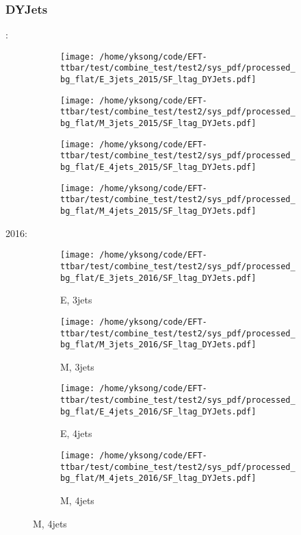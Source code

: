 \documentclass{beamer}
\begin{document}
\begin{frame}
\frametitle{DYJets}
\fontsize{5}{1}:
\begin{figure}
\centering
\begin{subfigure}[b]{0.24\textwidth}
\texttt{[image: /home/yksong/code/EFT-ttbar/test/combine\_test/test2/sys\_pdf/processed\_bg\_flat/E\_3jets\_2015/SF\_ltag\_DYJets.pdf]}
\end{subfigure}
\begin{subfigure}[b]{0.24\textwidth}
\texttt{[image: /home/yksong/code/EFT-ttbar/test/combine\_test/test2/sys\_pdf/processed\_bg\_flat/M\_3jets\_2015/SF\_ltag\_DYJets.pdf]}
\end{subfigure}
\begin{subfigure}[b]{0.24\textwidth}
\texttt{[image: /home/yksong/code/EFT-ttbar/test/combine\_test/test2/sys\_pdf/processed\_bg\_flat/E\_4jets\_2015/SF\_ltag\_DYJets.pdf]}
\end{subfigure}
\begin{subfigure}[b]{0.24\textwidth}
\texttt{[image: /home/yksong/code/EFT-ttbar/test/combine\_test/test2/sys\_pdf/processed\_bg\_flat/M\_4jets\_2015/SF\_ltag\_DYJets.pdf]}
\end{subfigure}
\end{figure}
2016:
\begin{figure}
\centering
\begin{subfigure}[b]{0.24\textwidth}
\texttt{[image: /home/yksong/code/EFT-ttbar/test/combine\_test/test2/sys\_pdf/processed\_bg\_flat/E\_3jets\_2016/SF\_ltag\_DYJets.pdf]}
\captionsetup{font=tiny}
\caption{E, 3jets}
\end{subfigure}
\begin{subfigure}[b]{0.24\textwidth}
\texttt{[image: /home/yksong/code/EFT-ttbar/test/combine\_test/test2/sys\_pdf/processed\_bg\_flat/M\_3jets\_2016/SF\_ltag\_DYJets.pdf]}
\captionsetup{font=tiny}
\caption{M, 3jets}
\end{subfigure}
\begin{subfigure}[b]{0.24\textwidth}
\texttt{[image: /home/yksong/code/EFT-ttbar/test/combine\_test/test2/sys\_pdf/processed\_bg\_flat/E\_4jets\_2016/SF\_ltag\_DYJets.pdf]}
\captionsetup{font=tiny}
\caption{E, 4jets}
\end{subfigure}
\begin{subfigure}[b]{0.24\textwidth}
\texttt{[image: /home/yksong/code/EFT-ttbar/test/combine\_test/test2/sys\_pdf/processed\_bg\_flat/M\_4jets\_2016/SF\_ltag\_DYJets.pdf]}
\captionsetup{font=tiny}
\caption{M, 4jets}
\end{subfigure}
\end{figure}
\end{frame}
\end{document}
